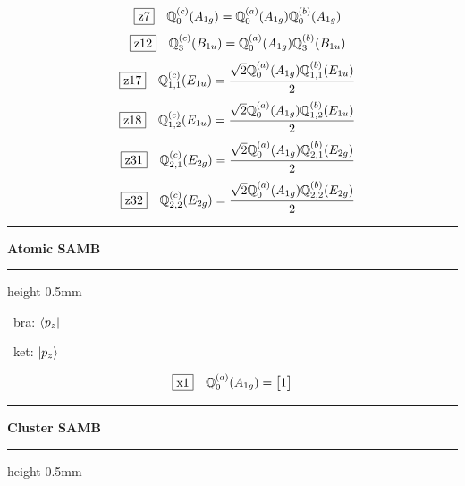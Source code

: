 \documentclass[fleqn,10pt,landscape]{jsarticle}
\begin{document}
\begin{dmath*}
\hspace*{3mm}\fbox{z7}\quad \mathbb{Q}_{0}^{(c)}(A_{1g})=\mathbb{Q}_{0}^{(a)}(A_{1g}) \mathbb{Q}_{0}^{(b)}(A_{1g})
\end{dmath*}
\begin{dmath*}
\hspace*{3mm}\fbox{z12}\quad \mathbb{Q}_{3}^{(c)}(B_{1u})=\mathbb{Q}_{0}^{(a)}(A_{1g}) \mathbb{Q}_{3}^{(b)}(B_{1u})
\end{dmath*}
\begin{dmath*}
\hspace*{3mm}\fbox{z17}\quad \mathbb{Q}_{1,1}^{(c)}(E_{1u})=\frac{\sqrt{2} \mathbb{Q}_{0}^{(a)}(A_{1g}) \mathbb{Q}_{1,1}^{(b)}(E_{1u})}{2}
\end{dmath*}
\begin{dmath*}
\hspace*{3mm}\fbox{z18}\quad \mathbb{Q}_{1,2}^{(c)}(E_{1u})=\frac{\sqrt{2} \mathbb{Q}_{0}^{(a)}(A_{1g}) \mathbb{Q}_{1,2}^{(b)}(E_{1u})}{2}
\end{dmath*}
\begin{dmath*}
\hspace*{3mm}\fbox{z31}\quad \mathbb{Q}_{2,1}^{(c)}(E_{2g})=\frac{\sqrt{2} \mathbb{Q}_{0}^{(a)}(A_{1g}) \mathbb{Q}_{2,1}^{(b)}(E_{2g})}{2}
\end{dmath*}
\begin{dmath*}
\hspace*{3mm}\fbox{z32}\quad \mathbb{Q}_{2,2}^{(c)}(E_{2g})=\frac{\sqrt{2} \mathbb{Q}_{0}^{(a)}(A_{1g}) \mathbb{Q}_{2,2}^{(b)}(E_{2g})}{2}
\end{dmath*}
\vspace{5mm}

\vspace{5mm}
\noindent \rule[0.5mm]{5mm}{0.5mm}\hspace{3mm}\textbf{Atomic SAMB}\hspace{3mm}\leaders\hrule height 0.5mm\hfill\kern0pt
\vspace{3mm}

\vspace{5mm}

\noindent\textbullet\, bra: $\bra{p_{z}}$

\noindent\textbullet\, ket: $\ket{p_{z}}$

\begin{dmath*}
\fbox{x1}\quad \mathbb{Q}_{0}^{(a)}(A_{1g})=\begin{bmatrix} 1 \end{bmatrix}
\end{dmath*}
\vspace{5mm}
\noindent \rule[0.5mm]{5mm}{0.5mm}\hspace{3mm}\textbf{Cluster SAMB}\hspace{3mm}\leaders\hrule height 0.5mm\hfill\kern0pt
\vspace{3mm}
\end{document}
